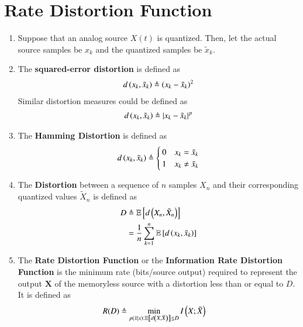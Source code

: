 \documentclass[journal,12pt,twocolumn]{IEEEtran}
\let\vec\mathbf
\renewcommand\thesection{\arabic{section}}
\begin{document}
\section{Rate Distortion Function}
\begin{enumerate}[label=\thesection.\arabic*, ref=\thesection.\theenumi]
    \item Suppose that an analog source $X(t)$ is quantized. Then, let the 
    actual source samples be $x_k$ and the quantized samples be $\tilde{x}_k$.
    \item The \textbf{squared-error distortion} is defined as 
    \begin{align}
        d\left(x_k, \tilde{x}_k\right) \triangleq \left(x_k - \tilde{x}_k\right)^2
        \label{eq:sqr-err-def}
    \end{align}
    Similar distortion measures could be defined as 
    \begin{align}
        d\left(x_k, \tilde{x}_k\right) \triangleq \left\vert x_k - \tilde{x}_k\right\vert^p
        \label{eq:dis-err-def}
    \end{align}
    \item The \textbf{Hamming Distortion} is defined as
    \begin{align}
        d\left(x_k, \tilde{x}_k\right) \triangleq
        \begin{cases}
            0 & x_k = \tilde{x}_k \\
            1 & x_k \neq \tilde{x}_k
        \end{cases}
    \end{align}
    \item The \textbf{Distortion} between a sequence of $n$ samples $X_n$ 
    and their corresponding quantized values $\tilde{X}_n$ is defined as 
    \begin{align}
        D &\triangleq \mathbb{E}\left[d\left(X_n,\tilde{X}_n\right)\right] \\
        &= \frac{1}{n}\sum_{k=1}^n\mathbb{E}\left[d\left(x_k, \tilde{x}_k\right)\right]
        \label{eq:dis-seq-def}
    \end{align}
    \item The \textbf{Rate Distortion Function} or the 
    \textbf{Information Rate Distortion Function} is the minimum rate 
    (bits/source output) required to represent the output $\vec{X}$ of the 
    memoryless source with a distortion less than or equal to $D$. It is 
    defined as 
    \begin{align}
        R(D) &\triangleq \min_{p\brak{\tilde{x}|x}:\exval{d\brak{X,\tilde{X}}} \le D} I\brak{X;\tilde{X}}
        \label{eq:rdf-def}

\end{align}
\end{enumerate}
\end{document}
